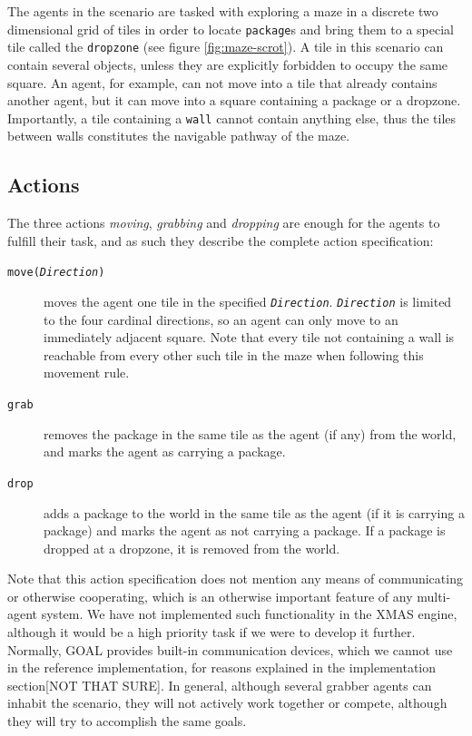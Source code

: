 The agents in the scenario are tasked with exploring a maze in a discrete
two dimensional grid of tiles in order to locate \texttt{package}s
and bring them to a special tile called the \texttt{dropzone} (see
figure \ref{fig:maze-scrot}). A tile in this scenario can contain
several objects, unless they are explicitly forbidden to occupy the
same square. An agent, for example, can not move into a tile that
already contains another agent, but it can move into a square containing
a package or a dropzone. Importantly, a tile containing a \texttt{wall}
cannot contain anything else, thus the tiles between walls constitutes
the navigable pathway of the maze. 


\subsection*{Actions}

The three actions \emph{moving}, \emph{grabbing} and \emph{dropping}
are enough for the agents to fulfill their task, and as such they
describe the complete action specification:
\begin{description}
\item [{\texttt{move(}\texttt{\emph{Direction}}\texttt{)}}] moves the agent
one tile in the specified \texttt{\emph{Direction}}. \texttt{\emph{Direction}}\emph{
}is limited to the four cardinal directions, so an agent can only
move to an immediately adjacent square. Note that every tile not containing
a wall is reachable from every other such tile in the maze when following
this movement rule.
\item [{\texttt{grab}}] removes the package in the same tile as the agent
(if any) from the world, and marks the agent as carrying a package.
\item [{\texttt{drop}}] adds a package to the world in the same tile as
the agent (if it is carrying a package) and marks the agent as not
carrying a package. If a package is dropped at a dropzone, it is removed
from the world.
\end{description}
Note that this action specification does not mention any means of
communicating or otherwise cooperating, which is an otherwise important
feature of any multi-agent system. We have not implemented such functionality
in the XMAS engine, although it would be a high priority task if we
were to develop it further. Normally, GOAL provides built-in communication
devices, which we cannot use in the reference implementation, for
reasons explained in the implementation section{[}NOT THAT SURE{]}.
In general, although several grabber agents can inhabit the scenario,
they will not actively work together or compete, although they will
try to accomplish the same goals.


